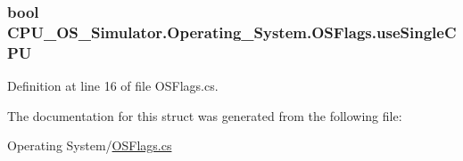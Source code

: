 \subsubsection[{use\+Single\+C\+P\+U}]{\setlength{\rightskip}{0pt plus 5cm}bool C\+P\+U\+\_\+\+O\+S\+\_\+\+Simulator.\+Operating\+\_\+\+System.\+O\+S\+Flags.\+use\+Single\+C\+P\+U}\label{struct_c_p_u___o_s___simulator_1_1_operating___system_1_1_o_s_flags_a49e0bc2c9ec783c9fb0678ace83352cf}


Definition at line 16 of file O\+S\+Flags.\+cs.



The documentation for this struct was generated from the following file\+:\begin{DoxyCompactItemize}
\item 
Operating System/\hyperlink{_o_s_flags_8cs}{O\+S\+Flags.\+cs}\end{DoxyCompactItemize}
